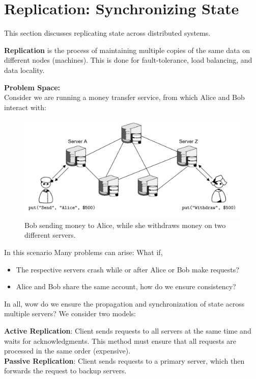 \newpage
\section{Replication: Synchronizing State}

This section discusses replicating state across distributed systems.

\begin{Def}[Replication]

    \textbf{Replication} is the process of maintaining multiple copies of the same data on different nodes (machines). 
    This is done for fault-tolerance, load balancing, and data locality.
\end{Def}

\noindent
\textbf{Problem Space:}\\
Consider we are running a money transfer service, from which Alice and Bob interact with:
\begin{figure}[h]
    \centering
    \includegraphics[width=.9\textwidth]{Sections/rep/intro.png}
    \caption{Bob sending money to Alice, while she withdraws money on two different servers.}
\end{figure}

\noindent
In this scenario Many problems can arise: What if,
\begin{itemize}
    \item The respective servers crash while or after Alice or Bob make requests?
    \item Alice and Bob share the same account, how do we ensure consistency?
\end{itemize}

\noindent
In all, wow do we ensure the propagation and synchronization of state across multiple servers?
We consider two models:
\begin{Def}

    \textbf{Active Replication}: Client sends requests to all servers at the same time and waits for acknowledgments. This method must ensure that all 
    requests are processed in the same order (expensive).\\
    
    \noindent
    \textbf{Passive Replication}: Client sends requests to a primary server, which then forwards the request to backup servers.
\end{Def}


